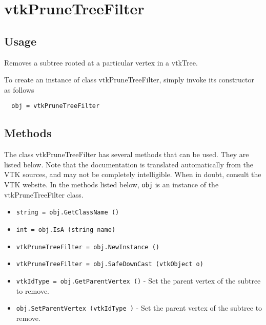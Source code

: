 \section{vtkPruneTreeFilter}

\subsection{Usage}

 Removes a subtree rooted at a particular vertex in a vtkTree.


To create an instance of class vtkPruneTreeFilter, simply
invoke its constructor as follows
\begin{verbatim}
  obj = vtkPruneTreeFilter
\end{verbatim}
\subsection{Methods}

The class vtkPruneTreeFilter has several methods that can be used.
  They are listed below.
Note that the documentation is translated automatically from the VTK sources,
and may not be completely intelligible.  When in doubt, consult the VTK website.
In the methods listed below, \verb|obj| is an instance of the vtkPruneTreeFilter class.
\begin{itemize}
\item  \verb|string = obj.GetClassName ()|

\item  \verb|int = obj.IsA (string name)|

\item  \verb|vtkPruneTreeFilter = obj.NewInstance ()|

\item  \verb|vtkPruneTreeFilter = obj.SafeDownCast (vtkObject o)|

\item  \verb|vtkIdType = obj.GetParentVertex ()| -  Set the parent vertex of the subtree to remove.

\item  \verb|obj.SetParentVertex (vtkIdType )| -  Set the parent vertex of the subtree to remove.

\end{itemize}
